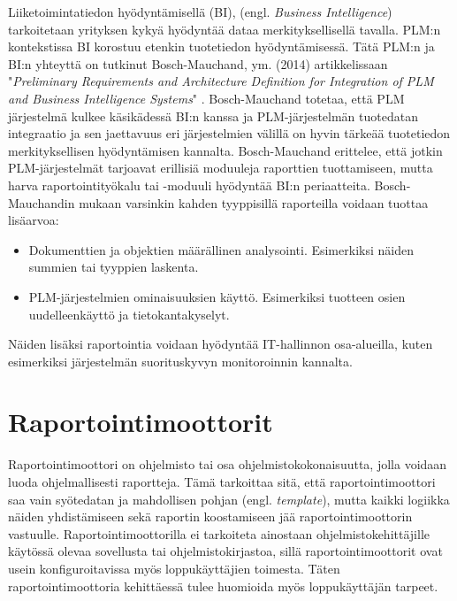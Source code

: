 Liiketoimintatiedon hyödyntämisellä (BI), (engl. \textit{Business Intelligence}) tarkoitetaan yrityksen kykyä hyödyntää dataa merkityksellisellä tavalla. PLM:n kontekstissa BI korostuu etenkin tuotetiedon hyödyntämisessä. Tätä PLM:n ja BI:n yhteyttä on tutkinut Bosch-Mauchand, ym. (2014) artikkelissaan "\textit{Preliminary Requirements and Architecture Definition for Integration of PLM and Business Intelligence Systems}" \cite{bayro-corrochano_preliminary_2014}. Bosch-Mauchand totetaa, että PLM järjestelmä kulkee käsikädessä BI:n kanssa ja PLM-järjestelmän tuotedatan integraatio ja sen jaettavuus eri järjestelmien välillä on hyvin tärkeää tuotetiedon merkityksellisen hyödyntämisen kannalta.
Bosch-Mauchand erittelee, että jotkin PLM-järjestelmät tarjoavat erillisiä moduuleja raporttien tuottamiseen, mutta harva raportointityökalu tai -moduuli hyödyntää BI:n periaatteita. Bosch-Mauchandin mukaan varsinkin kahden tyyppisillä raporteilla voidaan tuottaa lisäarvoa: \cite{bayro-corrochano_preliminary_2014}
\begin{itemize}
\item Dokumenttien ja objektien määrällinen analysointi. Esimerkiksi näiden summien tai tyyppien laskenta.
\item PLM-järjestelmien ominaisuuksien käyttö. Esimerkiksi tuotteen osien uudelleenkäyttö ja tietokantakyselyt.
\end{itemize}
Näiden lisäksi raportointia voidaan hyödyntää IT-hallinnon osa-alueilla, kuten esimerkiksi järjestelmän suorituskyvyn monitoroinnin kannalta.

\section{Raportointimoottorit} \label{Raportointimoottorit}

Raportointimoottori on ohjelmisto tai osa ohjelmistokokonaisuutta, jolla voidaan luoda ohjelmallisesti raportteja. Tämä tarkoittaa sitä, että raportointimoottori saa vain syötedatan ja mahdollisen pohjan (engl. \textit{template}), mutta kaikki logiikka näiden yhdistämiseen sekä raportin koostamiseen jää raportointimoottorin vastuulle. \cite{he_design_2010} Raportointimoottorilla ei tarkoiteta ainostaan ohjelmistokehittäjille käytössä olevaa sovellusta tai ohjelmistokirjastoa, sillä raportointimoottorit ovat usein konfiguroitavissa myös loppukäyttäjien toimesta. Täten raportointimoottoria kehittäessä tulee huomioida myös loppukäyttäjän tarpeet. \cite{adhi_performance_2019}


